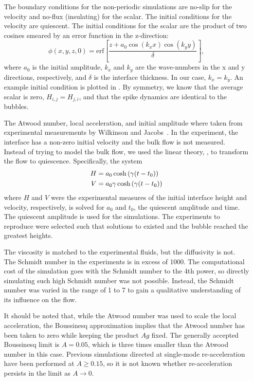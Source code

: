 The boundary conditions for the non-periodic simulations are no-slip for the velocity and no-flux (insulating) for the scalar.
The initial conditions for the velocity are quiescent.
The initial conditions for the scalar are the product of two cosines smeared by an error function in the z-direction:
\begin{equation}
  \phi(x,y,z,0) = \text{erf}\left[ \frac{z + a_0 \cos(k_x x) \cos(k_y y)}{\delta} \right] ,
\end{equation}
where $a_0$ is the initial amplitude,
$k_x$ and $k_y$ are the wave-numbers in the x and y directions, respectively, and
$\delta$ is the interface thickness.
In our case, $k_x = k_y$.
An example initial condition is plotted in .
By symmetry, we know that the average scalar is zero, $H_{i,j} = H_{j,i}$, and that the spike dynamics are identical to the bubbles.

The Atwood number, local acceleration, and initial amplitude where taken from experimental measurements by Wilkinson and Jacobs~\cite{Wilkinson2007, JacobsPrivate}.
In the experiment, the interface has a non-zero initial velocity and the bulk flow is not measured.
Instead of trying to model the bulk flow, we used the linear theory, , to transform the flow to quiescence.
Specifically, the system
\begin{align} \elabel{rollback}
H &= a_0 \cosh\left(\gamma (t - t_0)\right) \\
V &= a_0 \gamma \cosh\left(\gamma (t-t_0) \right)  \nonumber
\end{align}
where $H$ and $V$ were the experimental measures of the initial interface height and velocity, respectively,
is solved for $a_0$ and $t_0$, the quiescent amplitude and time.
The quiescent amplitude is used for the simulations.
The experiments to reproduce were selected such that solutions to  existed and the bubble reached the greatest heights.

The viscosity is matched to the experimental fluids, but the diffusivity is not.
The Schmidt number in the experiments is in excess of 1000.
The computational cost of the simulation goes with the Schmidt number to the 4th power, so directly simulating such high Schmidt number was not possible.
Instead, the Schmidt number was varied in the range of 1 to 7 to gain a qualitative understanding of its influence on the flow.

It should be noted that, while the Atwood number was used to scale the local acceleration, the Boussinesq approximation implies that the Atwood number has been taken to zero while keeping the product $Ag$ fixed.
The generally accepted Boussinesq limit is $A = 0.05$, which is three times smaller than the Atwood number in this case.
Previous simulations directed at single-mode re-acceleration have been performed at $A \ge 0.15$, so it is not known whether re-acceleration persists in the limit as $A \rightarrow 0$.

